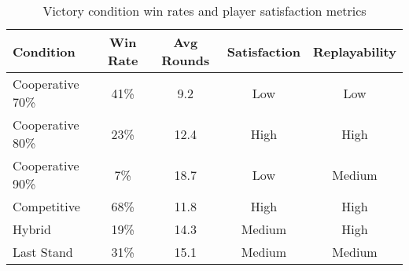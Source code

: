 \begin{table}[h]
\centering
\caption{Victory condition win rates and player satisfaction metrics}
\label{tab:victory}
\begin{tabular}{@{}lcccc@{}}
\toprule
Condition & Win Rate & Avg Rounds & Satisfaction & Replayability \\
\midrule
Cooperative 70\% & 41\% & 9.2 & Low & Low \\
Cooperative 80\% & 23\% & 12.4 & High & High \\
Cooperative 90\% & 7\% & 18.7 & Low & Medium \\
Competitive & 68\% & 11.8 & High & High \\
Hybrid & 19\% & 14.3 & Medium & High \\
Last Stand & 31\% & 15.1 & Medium & Medium \\
\bottomrule
\end{tabular}
\end{table}